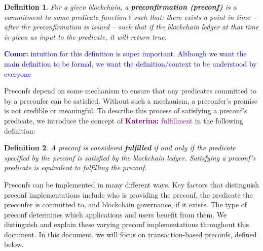 \documentclass[a4paper]{article}
\theoremstyle{boldstyle}
\newtheorem{definitionx}{Definition}
\newenvironment{definition}
  {\begin{defopenboxq}\begin{definitionx}}
  {\end{definitionx}\end{defopenboxq}}
\newcommand{\cm}[1]{\textcolor{blue}{\textbf{Conor:} #1}}
\newcommand{\ks}[1]{\textcolor{purple}{\textbf{Katerina:} #1}}
\begin{document}
    
    
    
    

        \begin{definition}
        \label{def:preconfer}
        For a given blockchain, a \textbf{preconfirmation (preconf)} is a commitment to some predicate function $\mathsf{f}$ such that: there exists a point in time -- after the preconfirmation is issued -- such that if the blockchain ledger at that time is given as input to the predicate, it will return true. 
        \end{definition}

        \cm{intuition for this definition is super important. Although we want the main definition to be formal, we want the definition/context to be understood by everyone} 
        
         \par
         Preconfs depend on some mechanism to ensure that any predicates committed to by a preconfer can be satisfied. Without such a mechanism, a preconfer's promise is not credible or meaningful. To describe this process of satisfying a preconf's predicate, we introduce the concept of \ks{fulfillment} in the following definition:
     \begin{definition}\label{def:delivery}
    A preconf is considered \textbf{fulfilled }if and only if the predicate specified by the preconf is satisfied by the blockchain ledger. Satisfying a preconf's predicate is equivalent to fulfilling the preconf.
    \end{definition}
     Preconfs can be implemented in many different ways. Key factors that distinguish preconf implementations include who is providing the preconf, the predicate the preconfer is committed to, and blockchain governance, if it exists. The type of preconf determines which applications and users benefit from them.  We distinguish and explain these varying preconf implementations throughout this document. In this document, we will focus on transaction-based preconfs, defined below.
     
\end{document}
